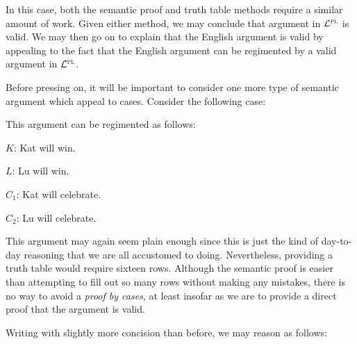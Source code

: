 In this case, both the semantic proof and truth table methods require a similar amount of work.
Given either method, we may conclude that argument in $\mathcal{L}^{\textsc{pl}}$ is valid. 
We may then go on to explain that the English argument is valid by appealing to the fact that the English argument can be regimented by a valid argument in $\mathcal{L}^{\textsc{pl}}$.

Before pressing on, it will be important to consider one more type of semantic argument which appeal to cases.
Consider the following case:

\begin{earg}
\end{earg}

This argument can be regimented as follows:

\begin{ekey}
  \item[$K$:] Kat will win.
  \item[$L$:] Lu will win.
  \item[$C_1$:] Kat will celebrate.
  \item[$C_2$:] Lu will celebrate.
\end{ekey}

\begin{earg}
\end{earg}

This argument may again seem plain enough since this is just the kind of day-to-day reasoning that we are all accustomed to doing.
Nevertheless, providing a truth table would require sixteen rows.
Although the semantic proof is easier than attempting to fill out so many rows without making any mistakes, there is no way to avoid a \textit{proof by cases}, at least insofar as we are to provide a direct proof that the argument is valid.

Writing with slightly more concision than before, we may reason as follows:

